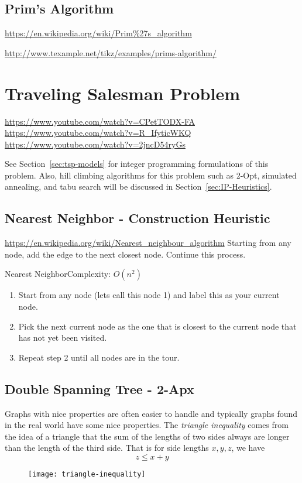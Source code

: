\documentclass[../open-optimization/open-optimization.tex]{subfiles}
\begin{document}
%

\subsection{Prim's Algorithm}
\url{https://en.wikipedia.org/wiki/Prim\%27s_algorithm}


\url{http://www.texample.net/tikz/examples/prims-algorithm/}


\section{Traveling Salesman Problem}
\url{https://www.youtube.com/watch?v=CPetTODX-FA}
\url{https://www.youtube.com/watch?v=R_IfyticWKQ}
\url{https://www.youtube.com/watch?v=2jncD54ryGs}

See Section~\ref{sec:tsp-models} for integer programming formulations of this problem.  Also, hill climbing algorithms for this problem such as 2-Opt, simulated annealing, and tabu search will be discussed in Section~\ref{sec:IP-Heuristics}.

\subsection{Nearest Neighbor - Construction Heuristic}
\url{https://en.wikipedia.org/wiki/Nearest_neighbour_algorithm}
Starting from any node, add the edge to the next closest node.  Continue this process.
\begin{general}{Nearest Neighbor}{Complexity: $O(n^2)$}
\label{heuristic:nearestNeighbor}
\begin{enumerate}
\item Start from any node (lets call this node 1) and label this as your current node.
\item Pick the next current node as the one that is closest to the current node that has not yet been visited.
\item Repeat step 2 until all nodes are in the tour.
\end{enumerate}
\end{general}

\subsection{Double Spanning Tree - 2-Apx}
Graphs with nice properties are often easier to handle and typically graphs found in the real world have some nice properties. The \emph{triangle inequality} comes from the idea of a triangle that the sum of the lengths of two sides always are longer than the length of the third side.  That is for side lengths $x,y,z$, we have
$$
z \leq x + y
$$
\begin{figure}[H]
\begin{center}
\texttt{[image: triangle-inequality]}\footnotemark
\end{center}
\end{figure}
\end{document}
